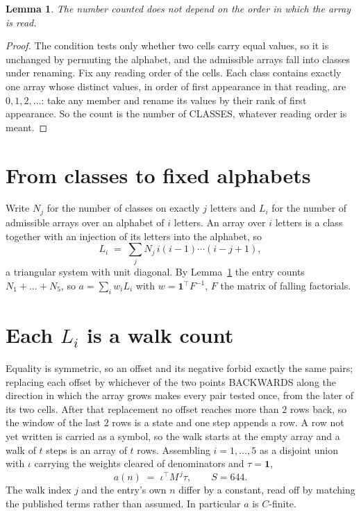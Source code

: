 \documentclass[11pt,a4paper]{article}
\theoremstyle{plain}
\newtheorem{lemma}[theorem]{Lemma}
\theoremstyle{definition}
\begin{document}
\begin{lemma}\label{lem:order}
The number counted does not depend on the order in which the array is read.
\end{lemma}

\begin{proof}
The condition tests only whether two cells carry equal values, so it is unchanged by permuting
the alphabet, and the admissible arrays fall into classes under renaming. Fix any reading order
of the cells. Each class contains exactly one array whose distinct values, in order of first
appearance in that reading, are $0,1,2,\dots$: take any member and rename its values by their
rank of first appearance. So the count is the number of CLASSES, whatever reading order is
meant.
\end{proof}

\section{From classes to fixed alphabets}

Write $N_j$ for the number of classes on exactly $j$ letters and $L_i$ for the number of
admissible arrays over an alphabet of $i$ letters. An array over $i$ letters is a class together
with an injection of its letters into the alphabet, so
\[
L_i\;=\;\sum_j N_j\,i(i-1)\cdots(i-j+1),
\]
a triangular system with unit diagonal. By Lemma~\ref{lem:order} the entry counts
$N_1+\dots+N_{5}$, so $a=\sum_i w_iL_i$ with $w=\mathbf{1}^{\!\top}F^{-1}$, $F$ the
matrix of falling factorials.

\section{Each $L_i$ is a walk count}

Equality is symmetric, so an offset and its negative forbid exactly the same pairs; replacing
each offset by whichever of the two points BACKWARDS along the direction in which the array
grows makes every pair tested once, from the later of its two cells. After that replacement no
offset reaches more than $2$ rows back, so the window of the last $2$
rows is a state and one step appends a row. A row not yet written is
carried as a symbol, so the walk starts at the empty array and a walk of $t$ steps is an array
of $t$ rows. Assembling $i=1,\dots,5$ as a disjoint union with $\iota$ carrying the
weights cleared of denominators and $\tau=\mathbf{1}$,
\[
a(n)\;=\;\iota^{\!\top}M^{\,j}\tau ,\qquad S=644.
\]
The walk index $j$ and the entry's own $n$ differ by a constant, read off by matching the
published terms rather than assumed. In particular $a$ is $C$-finite.
\end{document}
